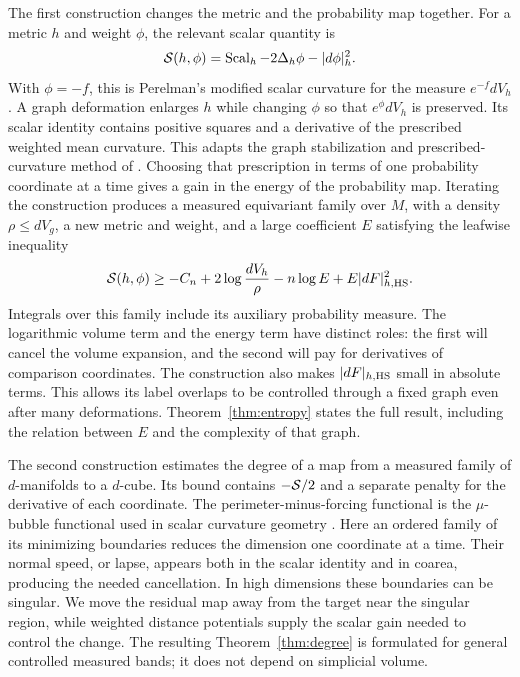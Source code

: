 The first construction changes the metric and the probability map
together. For a metric \(h\) and weight \(\phi\), the relevant scalar
quantity is
\[
  \mathcal S(h,\phi)=\operatorname{Scal}_h-2\Delta_h\phi-|d\phi|_h^2.
\]
With \(\phi=-f\), this is Perelman's modified scalar curvature for the
measure \(e^{-f}dV_h\) \cite[Section 1.3]{Perelman2002}.
A graph deformation enlarges \(h\) while changing \(\phi\) so that
\(e^\phi dV_h\) is preserved. Its scalar identity contains positive
squares and a derivative of the prescribed weighted mean curvature.
This adapts the graph stabilization and prescribed-curvature method of
\cite[Proposition 4.1 and Theorem 5.2]{OpenAIScalarInessentiality2026}.
Choosing that prescription in terms of one probability coordinate at
a time gives a gain in the energy of the probability map. Iterating
the construction produces a measured equivariant family over \(M\),
with a density \(\rho\le dV_g\), a new metric and weight, and a large
coefficient \(E\) satisfying the leafwise inequality
\[
  \mathcal S(h,\phi)\ge
  -C_n+2\log\frac{dV_h}{\rho}-n\log E+E|dF|_{h,\mathrm{HS}}^2.
\]
Integrals over this family include its auxiliary probability measure.
The logarithmic volume term and the energy term have distinct roles:
the first will cancel the volume expansion, and the second will pay
for derivatives of comparison coordinates. The construction also
makes \(|dF|_{h,\mathrm{HS}}\) small in absolute terms. This allows its label
overlaps to be controlled through a fixed graph even after many
deformations. Theorem~\ref{thm:entropy} states the full result, including the
relation between \(E\) and the complexity of that graph.

The second construction estimates the degree of a map from a
measured family of \(d\)-manifolds to a \(d\)-cube. Its bound contains
\(-\mathcal S/2\) and a separate penalty for the derivative of each
coordinate. The perimeter-minus-forcing functional is the
\(\mu\)-bubble functional used in scalar curvature geometry
\cite{Gromov1996,ChodoshLi2024}. Here an ordered family of its
minimizing boundaries reduces the dimension one coordinate at a time.
Their normal speed, or lapse, appears both in the scalar
identity and in coarea, producing the needed cancellation. In high
dimensions these boundaries can be singular. We move the residual
map away from the target near the singular region, while weighted
distance potentials supply the scalar gain needed to control the
change. The resulting Theorem~\ref{thm:degree} is formulated for general
controlled measured bands; it does not depend on simplicial volume.

